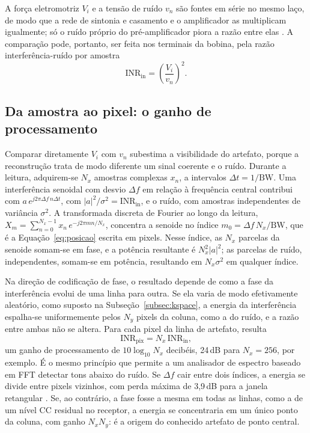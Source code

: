\documentclass[portuguese]{sbcreviews-2025}%
\begin{document}
A força eletromotriz $V_i$ e a tensão de ruído $v_n$ são fontes em série no mesmo laço, de modo que a rede de sintonia e casamento e o amplificador as multiplicam igualmente; só o ruído próprio do pré-amplificador piora a razão entre elas \citep{zanche2018rf}. A comparação pode, portanto, ser feita nos terminais da bobina, pela razão interferência-ruído por amostra
\begin{equation}
\mathrm{INR}_{\mathrm{in}} = \left(\frac{V_i}{v_n}\right)^{2}.
\label{eq:inr_in}
\end{equation}

\subsection{Da amostra ao pixel: o ganho de processamento}
\label{subsec:ganho}

Comparar diretamente $V_i$ com $v_n$ subestima a visibilidade do artefato, porque a reconstrução trata de modo diferente um sinal coerente e o ruído. Durante a leitura, adquirem-se $N_x$ amostras complexas $x_n$, a intervalos $\Delta t = 1/\mathrm{BW}$. Uma interferência senoidal com desvio $\Delta f$ em relação à frequência central contribui com $a\,e^{j2\pi\Delta f\,n\Delta t}$, com $|a|^2/\sigma^2 = \mathrm{INR}_{\mathrm{in}}$, e o ruído, com amostras independentes de variância $\sigma^2$. A transformada discreta de Fourier ao longo da leitura, $X_m = \sum_{n=0}^{N_x-1} x_n\,e^{-j2\pi mn/N_x}$, concentra a senoide no índice $m_0 = \Delta f\,N_x/\mathrm{BW}$, que é a Equação~\eqref{eq:posicao} escrita em pixels. Nesse índice, as $N_x$ parcelas da senoide somam-se em fase, e a potência resultante é $N_x^2|a|^2$; as parcelas de ruído, independentes, somam-se em potência, resultando em $N_x\sigma^2$ em qualquer índice.

Na direção de codificação de fase, o resultado depende de como a fase da interferência evolui de uma linha para outra. Se ela varia de modo efetivamente aleatório, como suposto na Subseção~\ref{subsec:kspace}, a energia da interferência espalha-se uniformemente pelos $N_y$ pixels da coluna, como a do ruído, e a razão entre ambas não se altera. Para cada pixel da linha de artefato, resulta
\begin{equation}
\mathrm{INR}_{\mathrm{pix}} = N_x\,\mathrm{INR}_{\mathrm{in}},
\label{eq:ganho}
\end{equation}
um ganho de processamento de $10\log_{10}N_x$ decibéis, 24\,dB para $N_x = 256$, por exemplo. É o mesmo princípio que permite a um analisador de espectro baseado em FFT detectar tons abaixo do ruído. Se $\Delta f$ cair entre dois índices, a energia se divide entre pixels vizinhos, com perda máxima de 3,9\,dB para a janela retangular \citep{harris1978}. Se, ao contrário, a fase fosse a mesma em todas as linhas, como a de um nível CC residual no receptor, a energia se concentraria em um único ponto da coluna, com ganho $N_xN_y$: é a origem do conhecido artefato de ponto central.
\end{document}
